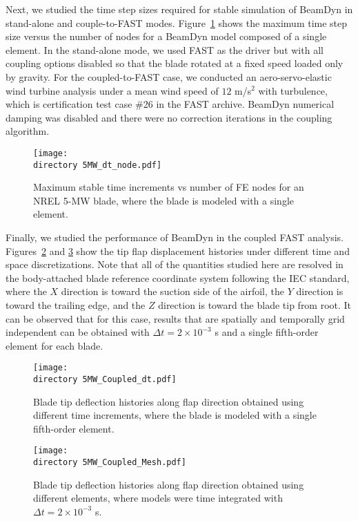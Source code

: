 \documentclass{aiaa-tc}
\def\directory{EPSF/}
\begin{document}
Next, we studied the time step sizes required for stable simulation of BeamDyn in stand-alone and couple-to-FAST modes. Figure~\ref{fig:5MWdt_node} shows the maximum time step size versus the number of nodes for a BeamDyn model composed of a single element. In the stand-alone mode, we used FAST as the driver but with all coupling options disabled so that the blade rotated at a fixed speed loaded only by gravity. For the coupled-to-FAST case, we conducted an aero-servo-elastic wind turbine analysis under a mean wind speed of $12$ m/s$^2$ with turbulence, which is  certification test case \#26 in the FAST archive.  BeamDyn numerical damping was disabled and there were no correction iterations in the coupling algorithm.

\begin{figure}
    \centering
\texttt{[image: \\directory  5MW\_dt\_node.pdf]}
\caption{Maximum stable time increments vs number of FE nodes for an NREL 5-MW blade, where the blade is modeled with a single element.}
\label{fig:5MWdt_node}
\end{figure} 

Finally, we studied the performance of BeamDyn in the coupled FAST analysis. Figures~\ref{fig:5MW_Coupled_dt} and \ref{fig:5MW_Coupled_Mesh} show the tip flap displacement histories under different time and space discretizations. Note that all of the quantities studied here are resolved in the body-attached blade reference coordinate system following the IEC standard, where the $X$ direction is toward the suction side of the airfoil, the $Y$ direction is toward the trailing edge, and the $Z$ direction is toward the blade tip from root. It can be observed that for this case, results that are spatially and temporally grid independent can be obtained with $\Delta t = 2 \times 10^{-3}$ s  and a single fifth-order element for each blade.  

\begin{figure}
    \centering
\texttt{[image: \\directory  5MW\_Coupled\_dt.pdf]}
\caption{Blade tip deflection histories along flap direction obtained using different time increments, where the blade is modeled with a single fifth-order element.}
\label{fig:5MW_Coupled_dt}
\end{figure} 

\begin{figure}
    \centering
\texttt{[image: \\directory  5MW\_Coupled\_Mesh.pdf]}
\caption{Blade tip deflection histories along flap direction obtained using different elements, where models were time integrated with $\Delta t = 2 \times 10^{-3}$ s.}
\label{fig:5MW_Coupled_Mesh}
\end{figure} 
\end{document}
